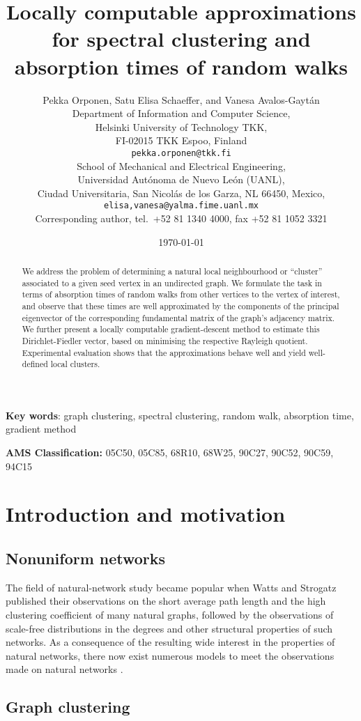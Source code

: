 \documentclass{article}
\title{Locally computable approximations for spectral clustering and
  absorption times of random walks}
\author{Pekka Orponen, Satu Elisa Schaeffer, and Vanesa Avalos-Gayt{\'{a}}n \\
 {\small Department of Information and Computer Science,} \\
{\small Helsinki University of Technology TKK,}\\
{\small FI-02015 TKK Espoo, Finland} \\
{\small \tt pekka.orponen@tkk.fi} \\
 {\small School of Mechanical and Electrical Engineering,} \\
{\small Universidad Aut\'{o}noma de Nuevo Le\'{o}n (UANL),} \\
{\small Ciudad Universitaria, San Nicol\'{a}s de los Garza, NL 66450, Mexico,} \\
{\small \tt elisa,vanesa@yalma.fime.uanl.mx} \\
 {\small Corresponding author, tel.\ +52 81 1340 4000, fax +52 81 1052 3321}}
\date{\today}
\begin{document}
\maketitle

\begin{abstract}
  We address the problem of determining a natural local neighbourhood
  or ``cluster'' associated to a given seed vertex in an undirected
  graph.  We formulate the task in terms of absorption times of random
  walks from other vertices to the vertex of interest, and observe
  that these times are well approximated by the components of the
  principal eigenvector of the corresponding fundamental matrix of the
  graph's adjacency matrix. We further present a locally computable
  gradient-descent method to estimate this Dirichlet-Fiedler vector,
  based on minimising the respective Rayleigh quotient. Experimental
  evaluation shows that the approximations behave well and yield
  well-defined local clusters.
\end{abstract}

{\bf Key words}:
  graph clustering, spectral clustering, random walk, absorption time,
  gradient method

{\bf AMS Classification:} 05C50, 05C85, 68R10, 68W25, 90C27, 90C52, 90C59, 94C15

\pagestyle{plain} 

\section{Introduction and motivation}

\subsection{Nonuniform networks}

The field of natural-network study became popular when Watts and
Strogatz \cite{WaSt98} published their observations on the short
average path length and the high clustering coefficient of many
natural graphs, followed by the observations of scale-free
distributions \cite{BaAl99,FFFa99} in the degrees and other structural
properties of such networks. As a consequence of the resulting wide
interest in the properties of natural networks, there now exist
numerous models to meet the observations made on natural networks
\cite{DoMe03,Newm03,Virt03}. 

\subsection{Graph clustering}
\end{document}
